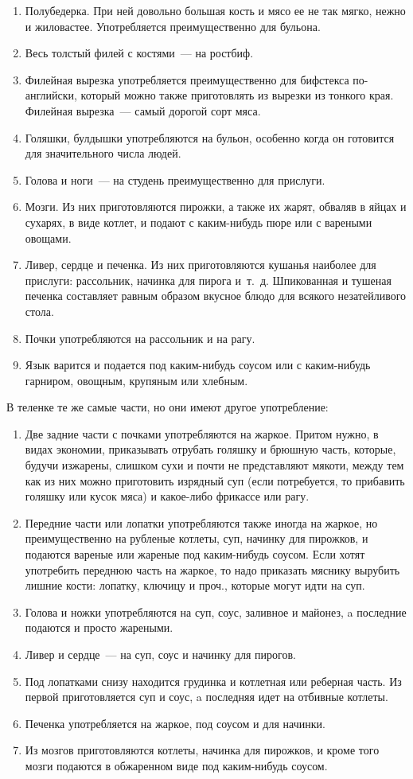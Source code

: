 \begin{enumerate}
	\item Полубедерка. При ней довольно большая кость и мясо ее не так мягко, нежно и жиловастее. Употребляется преимущественно для бульона.
	\item Весь толстый филей с костями~--- на ростбиф.
	\item Филейная вырезка употребляется преимущественно для бифстекса по-английски, который можно также приготовлять из вырезки из тонкого края. Филейная вырезка~--- самый дорогой сорт мяса.
	\item Голяшки, булдышки употребляются на бульон, особенно когда он готовится для значительного числа людей.
	\item Голова и ноги~--- на студень преимущественно для прислуги.
	\item Мозги. Из них приготовляются пирожки, а также их жарят, обваляв в яйцах и сухарях, в виде котлет, и подают с каким-нибудь пюре или с вареными овощами.
	\item Ливер, сердце и печенка. Из них приготовляются кушанья наиболее для прислуги: рассольник, начинка для пирога и~т.~д. Шпикованная и тушеная печенка составляет равным образом вкусное блюдо для всякого незатейливого стола.
	\item Почки употребляются на рассольник и на рагу.
	\item Язык варится и подается под каким-нибудь соусом или с каким-нибудь гарниром, овощным, крупяным или хлебным.
\end{enumerate}

В теленке те же самые части, но они имеют другое употребление:
\begin{enumerate}
	\item Две задние части с почками употребляются на жаркое. Притом нужно, в видах экономии, приказывать отрубать голяшку и брюшную часть, которые, будучи изжарены, слишком сухи и почти не представляют мякоти, между тем как из них можно приготовить изрядный суп (если потребуется, то прибавить голяшку или кусок мяса) и какое-либо фрикассе или рагу.
	\item Передние части или лопатки употребляются также иногда на жаркое, но преимущественно на рубленые котлеты, суп, начинку для пирожков, и подаются вареные или жареные под каким-нибудь соусом. Если хотят употребить переднюю часть на жаркое, то надо приказать мяснику вырубить лишние кости: лопатку, ключицу и проч., которые могут идти на суп.
	\item Голова и ножки употребляются на суп, соус, заливное и майонез, a последние подаются и просто жареными.
	\item Ливер и сердце~--- на суп, соус и начинку для пирогов.
	\item Под лопатками снизу находится грудинка и котлетная или реберная часть. Из первой приготовляется суп и соус, a последняя идет на отбивные котлеты.
	\item Печенка употребляется на жаркое, под соусом и для начинки.
	\item Из мозгов приготовляются котлеты, начинка для пирожков, и кроме того мозги подаются в обжаренном виде под каким-нибудь соусом.
\end{enumerate}
    
